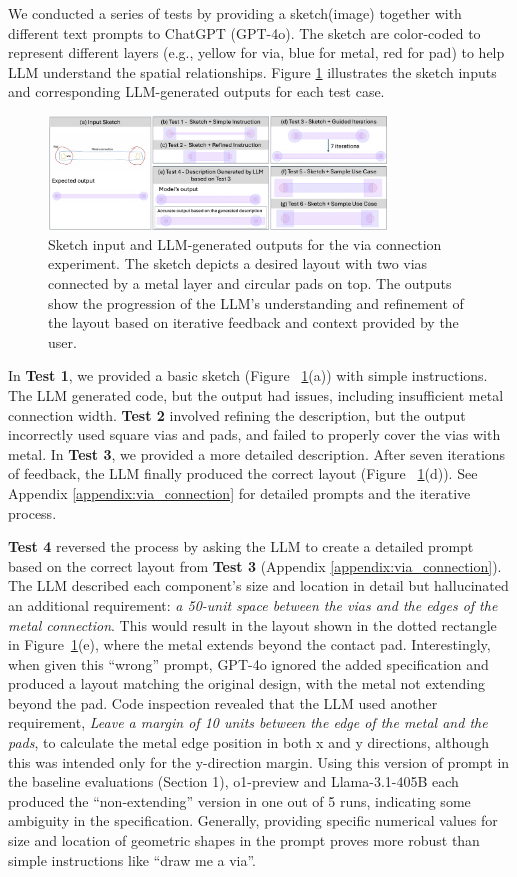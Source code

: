 \documentclass{article}
\begin{document}
We conducted a series of tests by providing a sketch(image) together with different text prompts to ChatGPT (GPT-4o). The sketch are color-coded to represent different layers (e.g., yellow for via, blue for metal, red for pad) to help LLM understand the spatial relationships. Figure \ref{fig:via_experiment} illustrates the sketch inputs and corresponding LLM-generated outputs for each test case.
\begin{figure}[h]
\centering
\includegraphics[width=0.8\textwidth]{Figure1_v5.png}
\caption{Sketch input and LLM-generated outputs for the via connection experiment. The sketch depicts a desired layout with two vias connected by a metal layer and circular pads on top. The outputs show the progression of the LLM's understanding and refinement of the layout based on iterative feedback and context provided by the user.}
\label{fig:via_experiment}
\end{figure}
In \textbf{Test 1}, we provided a basic sketch (Figure ~\ref{fig:via_experiment}(a)) with simple instructions. The LLM generated code, but the output had issues, including insufficient metal connection width. \textbf{Test 2} involved refining the description, but the output incorrectly used square vias and pads, and failed to properly cover the vias with metal. In \textbf{Test 3}, we provided a more detailed description. After seven iterations of feedback, the LLM finally produced the correct layout (Figure ~\ref{fig:via_experiment}(d)). See Appendix \ref{appendix:via_connection} for detailed prompts and the iterative process.

\textbf{Test 4} reversed the process by asking the LLM to create a detailed prompt based on the correct layout from \textbf{Test 3} (Appendix \ref{appendix:via_connection}). The LLM described each component's size and location in detail but hallucinated an additional requirement: \textit{a 50-unit space between the vias and the edges of the metal connection}. This would result in the layout shown in the dotted rectangle in Figure~\ref{fig:via_experiment}(e), where the metal extends beyond the contact pad. Interestingly, when given this ``wrong'' prompt, GPT-4o ignored the added specification and produced a layout matching the original design, with the metal not extending beyond the pad. Code inspection revealed that the LLM used another requirement, \textit{Leave a margin of 10 units between the edge of the metal and the pads}, to calculate the metal edge position in both x and y directions, although this was intended only for the y-direction margin. Using this version of prompt in the baseline evaluations (Section 1), o1-preview and Llama-3.1-405B each produced the ``non-extending'' version in one out of 5 runs, indicating some ambiguity in the specification. Generally, providing specific numerical values for size and location of geometric shapes in the prompt proves more robust than simple instructions like ``draw me a via''.
\end{document}

